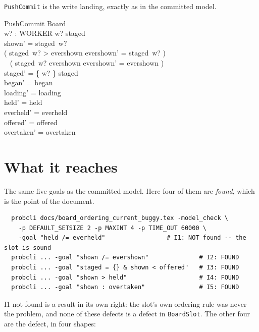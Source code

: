 \documentclass[a4paper,10pt,fleqn]{article}
\begin{document}
\texttt{PushCommit} is the write landing, exactly as in the committed model.

\begin{schema}{PushCommit}
  \Delta Board \\
  w? : WORKER
\where
  w? \in \dom staged \\
  shown' = staged~w? \\
  ( staged~w? > evershown \land evershown' = staged~w? ) \lor \\
  \quad~ ( staged~w? \leq evershown \land evershown' = evershown ) \\
  staged' = \{ w? \} \ndres staged \\
  began' = began \\
  loading' = loading \\
  held' = held \\
  everheld' = everheld \\
  offered' = offered \\
  overtaken' = overtaken
\end{schema}

\section{What it reaches}

The same five goals as the committed model. Here four of them are
\emph{found}, which is the point of the document.

\begin{verbatim}
  probcli docs/board_ordering_current_buggy.tex -model_check \
    -p DEFAULT_SETSIZE 2 -p MAXINT 4 -p TIME_OUT 60000 \
    -goal "held /= everheld"                 # I1: NOT found -- the slot is sound
  probcli ... -goal "shown /= evershown"              # I2: FOUND
  probcli ... -goal "staged = {} & shown < offered"   # I3: FOUND
  probcli ... -goal "shown > held"                    # I4: FOUND
  probcli ... -goal "shown : overtaken"               # I5: FOUND
\end{verbatim}

I1 not found is a result in its own right: the slot's own ordering rule was
never the problem, and none of these defects is a defect in
\texttt{BoardSlot}. The other four are the defect, in four shapes:
\end{document}
